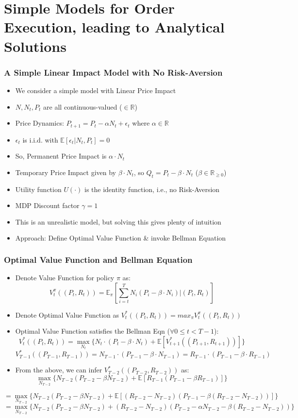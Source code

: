 \documentclass[handout]{beamer}
\begin{document}
\section{Simple Models for Order Execution, leading to Analytical Solutions}

\begin{frame}
\frametitle{A Simple Linear Impact Model with No Risk-Aversion}
\pause
\begin{itemize}[<+->]
\item We consider a simple model with Linear Price Impact
\item $N, N_t, P_t$ are all continuous-valued ($\in \mathbb{R}$)
\item Price Dynamics: $P_{t+1} = P_t - \alpha N_t + \epsilon_t$ where $\alpha \in \mathbb{R}$
\item $\epsilon_t$ is i.i.d. with $\mathbb{E}[\epsilon_t|N_t, P_t] = 0$
\item So, Permanent Price Impact is $\alpha \cdot N_t$
\item Temporary Price Impact given by $\beta \cdot N_t$, so $Q_t = P_t - \beta \cdot N_t$ ($\beta \in \mathbb{R}_{\geq 0}$)
\item Utility function $U(\cdot)$ is the identity function, i.e., no Risk-Aversion
\item MDP Discount factor $\gamma = 1$
\item This is an unrealistic model, but solving this gives plenty of intuition
\item Approach: Define Optimal Value Function \& invoke Bellman Equation
\end{itemize}
\end{frame}

\begin{frame}
\frametitle{Optimal Value Function and Bellman Equation}
\pause
\begin{itemize}
\item Denote Value Function for policy $\pi$ as: $$V^{\pi}_t((P_t, R_t)) = \mathbb{E}_{\pi}[\sum_{i=t}^T N_i (P_i - \beta \cdot N_i)|(P_t,R_t)]$$
\pause
\item Denote Optimal Value Function as $V^*_t((P_t,R_t)) = max_{\pi} V^{\pi}_t((P_t,R_t))$
\pause
\item Optimal Value Function satisfies the Bellman Eqn ($\forall 0 \leq t < T - 1$):
\pause
$$V^*_t((P_t,R_t)) = \max_{N_t} \{ N_t \cdot (P_t - \beta \cdot N_t)  + \mathbb{E}[V^*_{t+1}((P_{t+1}, R_{t+1}))] \}$$
\pause
$$V^*_{T-1}((P_{T-1},R_{T-1})) = N_{T-1} \cdot (P_{T-1} - \beta \cdot N_{T-1}) = R_{T-1} \cdot (P_{T-1} - \beta \cdot R_{T-1})$$
\pause
\item From the above, we can infer $V^*_{T-2}((P_{T-2},R_{T-2}))$ as:
\pause
$$\max_{N_{T-2}} \{ N_{T-2}(P_{T-2} - \beta N_{T-2})  + \mathbb{E}[R_{T-1}(P_{T-1} - \beta R_{T-1})] \}$$
\pause
\end{itemize}
$$=\max_{N_{T-2}} \{ N_{T-2}(P_{T-2} - \beta N_{T-2})  + \mathbb{E}[(R_{T-2} - N_{T-2})(P_{T-1} - \beta(R_{T-2} - N_{T-2}))] \}$$
\pause
$$=\max_{N_{T-2}} \{ N_{T-2}(P_{T-2} - \beta N_{T-2})  + (R_{T-2} - N_{T-2})(P_{T-2} - \alpha N_{T-2} - \beta(R_{T-2} - N_{T-2})) \}$$
\end{frame}
\end{document}
